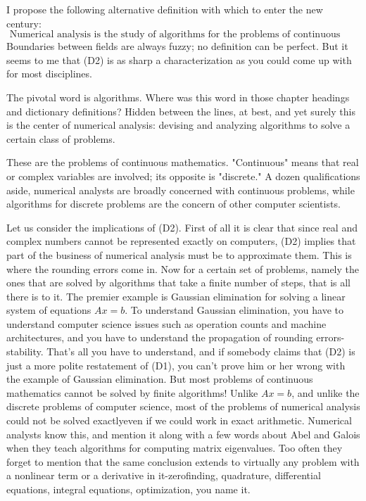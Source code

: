 I propose the following alternative definition with which to enter the new century:
\begin{equation}
\label{eq: D2}
    \text{ Numerical analysis is the study of algorithms for the problems of continuous mathematics. } \tag{D2}
\end{equation}
Boundaries between fields are always fuzzy; no definition can be perfect. But it seems to me that (D2) is as sharp a characterization as you could come up with for most disciplines.

The pivotal word is algorithms. Where was this word in those chapter headings and dictionary definitions? Hidden between the lines, at best, and yet surely this is the center of numerical analysis: devising and analyzing algorithms to solve a certain class of problems.

These are the problems of continuous mathematics. "Continuous" means that real or complex variables are involved; its opposite is "discrete." A dozen qualifications aside, numerical analysts are broadly concerned with continuous problems, while algorithms for discrete problems are the concern of other computer scientists.

Let us consider the implications of (D2). First of all it is clear that since real and complex numbers cannot be represented exactly on computers, (D2) implies that part of the business of numerical analysis must be to approximate them. This is where the rounding errors come in. Now for a certain set of problems, namely the ones that are solved by algorithms that take a finite number of steps, that is all there is to it. The premier example is Gaussian elimination for solving a linear system of equations $A x=b$. To understand Gaussian elimination, you have to understand computer science issues such as operation counts and machine architectures, and you have to understand the propagation of rounding errors-stability. That's all you have to understand, and if somebody claims that (D2) is just a more polite restatement of (D1), you can't prove him or her wrong with the example of Gaussian elimination.
But most problems of continuous mathematics cannot be solved by finite algorithms! Unlike $A x=b$, and unlike the discrete problems of computer science, most of the problems of numerical analysis could not be solved exactlyeven if we could work in exact arithmetic. Numerical analysts know this, and mention it along with a few words about Abel and Galois when they teach algorithms for computing matrix eigenvalues. Too often they forget to mention that the same conclusion extends to virtually any problem with a nonlinear term or a derivative in it-zerofinding, quadrature, differential equations, integral equations, optimization, you name it.

